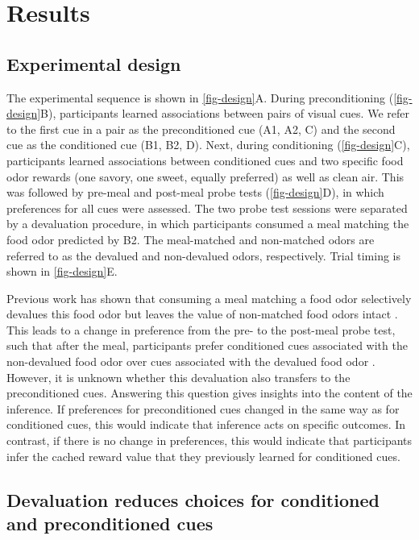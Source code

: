 \documentclass[12pt,letterpaper]{article}
\begin{document}
\section*{Results}
\label{sec-res}


\subsection*{Experimental design}
\label{subsec-design}



The experimental sequence is shown in \autoref{fig-design}A. During preconditioning (\autoref{fig-design}B), participants learned associations between pairs of visual cues. We refer to the first cue in a pair as the preconditioned cue (A1, A2, C) and the second cue as the conditioned cue (B1, B2, D). Next, during conditioning (\autoref{fig-design}C), participants learned associations between conditioned cues and two specific food odor rewards (one savory, one sweet, equally preferred) as well as clean air. This was followed by pre-meal and post-meal probe tests (\autoref{fig-design}D), in which preferences for all cues were assessed. The two probe test sessions were separated by a devaluation procedure, in which participants consumed a meal matching the food odor predicted by B2. The meal-matched and non-matched odors are referred to as the devalued and non-devalued odors, respectively. Trial timing is shown in \autoref{fig-design}E.

Previous work has shown that consuming a meal matching a food odor selectively devalues this food odor but leaves the value of non-matched food odors intact \citep{howard2017identity,HowRey2020,liu2025distinct}. This leads to a change in preference from the pre- to the post-meal probe test, such that after the meal, participants prefer conditioned cues associated with the non-devalued food odor over cues associated with the devalued food odor \citep{HowRey2020,liu2025distinct}. However, it is unknown whether this devaluation also transfers to the preconditioned cues. Answering this question gives insights into the content of the inference. If preferences for preconditioned cues changed in the same way as for conditioned cues, this would indicate that inference acts on specific outcomes. In contrast, if there is no change in preferences, this would indicate that participants infer the cached reward value that they previously learned for conditioned cues.




\subsection*{Devaluation reduces choices for conditioned and preconditioned cues}
\label{subsec-beh}
\end{document}
